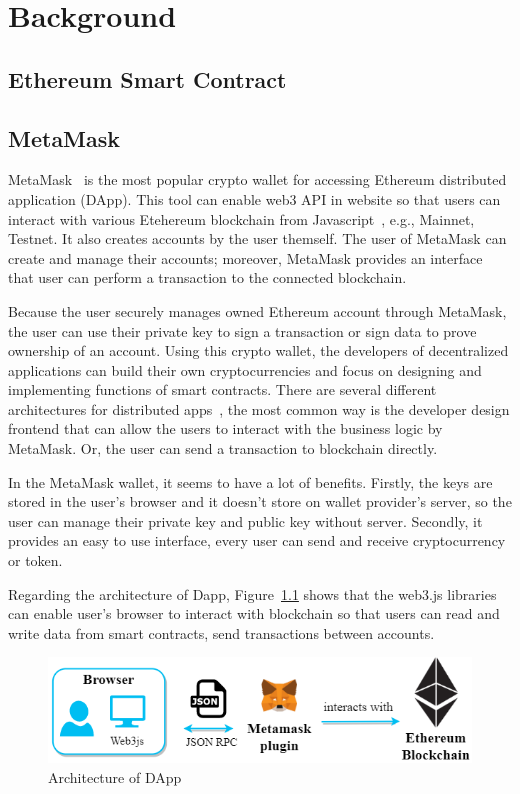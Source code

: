 \chapter{Background}
\label{chapter:background}

\section{Ethereum Smart Contract}

\newpage
\section{MetaMask}
MetaMask~\cite{metamask} is the most popular crypto wallet for accessing Ethereum distributed application (DApp). This tool can enable web3 API in website so that users can interact with various Etehereum blockchain from Javascript~\cite{web3.js}, e.g., Mainnet, Testnet. It also creates accounts by the user themself. The user of MetaMask can create and manage their accounts; moreover, MetaMask provides an interface that user can perform a transaction to the connected blockchain.\par
Because the user securely manages owned Ethereum account through MetaMask, the user can use their private key to sign a transaction or sign data to prove ownership of an account. Using this crypto wallet, the developers of decentralized applications can build their own cryptocurrencies and focus on designing and implementing functions of smart contracts. There are several different architectures for distributed apps~\cite{wessling2018engineering}, the most common way is the developer design frontend that can allow the users to interact with the business logic by MetaMask. Or, the user can send a transaction to blockchain directly.\par
In the MetaMask wallet, it seems to have a lot of benefits. Firstly, the keys are stored in the user's browser and it doesn't store on wallet provider's server, so the user can manage their private key and public key without server. Secondly, it provides an easy to use interface, every user can send and receive cryptocurrency or token.\par
Regarding the architecture of Dapp, Figure~\ref{fig:architecture_of_dapp} shows that the web3.js libraries can enable user's browser to interact with blockchain so that users can read and write data from smart contracts, send transactions between accounts. 


\begin{figure}[hb]
    \centering
    \includegraphics[height=!,width=1\linewidth,keepaspectratio=true]{figures/architecture_of_dapp.png}
    \caption{{\footnotesize Architecture of DApp}}
    \label{fig:architecture_of_dapp}
\end{figure}

